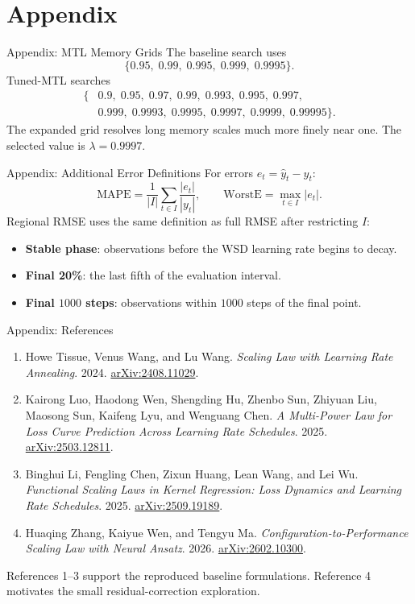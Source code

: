 \documentclass[aspectratio=169]{beamer}
\begin{document}
\appendix
\section{Appendix}

\begin{frame}{Appendix: MTL Memory Grids}
  The baseline search uses
  \[
    \{0.95,\;0.99,\;0.995,\;0.999,\;0.9995\}.
  \]
  Tuned-MTL searches
  \[
  \begin{split}
    \{&0.9,\;0.95,\;0.97,\;0.99,\;0.993,\;0.995,\;0.997,\\
      &0.999,\;0.9993,\;0.9995,\;0.9997,\;0.9999,\;0.99995\}.
  \end{split}
  \]
  The expanded grid resolves long memory scales much more finely near one. The selected value is \(\lambda=0.9997\).
\end{frame}

\begin{frame}{Appendix: Additional Error Definitions}
  For errors \(e_t=\widehat y_t-y_t\):
  \[
    \mathrm{MAPE}
      =\frac{1}{|I|}\sum_{t\in I}\frac{|e_t|}{|y_t|},
    \qquad
    \mathrm{WorstE}
      =\max_{t\in I}|e_t|.
  \]
  Regional RMSE uses the same definition as full RMSE after restricting \(I\):
  \begin{itemize}
    \item \textbf{Stable phase}: observations before the WSD learning rate begins to decay.
    \item \textbf{Final 20\%}: the last fifth of the evaluation interval.
    \item \textbf{Final \(1000\) steps}: observations within \(1000\) steps of the final point.
  \end{itemize}
\end{frame}

\begin{frame}{Appendix: References}
  \footnotesize
  \begin{enumerate}
    \item Howe Tissue, Venus Wang, and Lu Wang. \emph{Scaling Law with Learning Rate Annealing}. 2024. \href{https://arxiv.org/abs/2408.11029}{arXiv:2408.11029}.
    \item Kairong Luo, Haodong Wen, Shengding Hu, Zhenbo Sun, Zhiyuan Liu, Maosong Sun, Kaifeng Lyu, and Wenguang Chen. \emph{A Multi-Power Law for Loss Curve Prediction Across Learning Rate Schedules}. 2025. \href{https://arxiv.org/abs/2503.12811}{arXiv:2503.12811}.
    \item Binghui Li, Fengling Chen, Zixun Huang, Lean Wang, and Lei Wu. \emph{Functional Scaling Laws in Kernel Regression: Loss Dynamics and Learning Rate Schedules}. 2025. \href{https://arxiv.org/abs/2509.19189}{arXiv:2509.19189}.
    \item Huaqing Zhang, Kaiyue Wen, and Tengyu Ma. \emph{Configuration-to-Performance Scaling Law with Neural Ansatz}. 2026. \href{https://arxiv.org/abs/2602.10300}{arXiv:2602.10300}.
  \end{enumerate}
  \vspace{0.35em}
  References 1--3 support the reproduced baseline formulations. Reference 4 motivates the small residual-correction exploration.
\end{frame}
\end{document}
